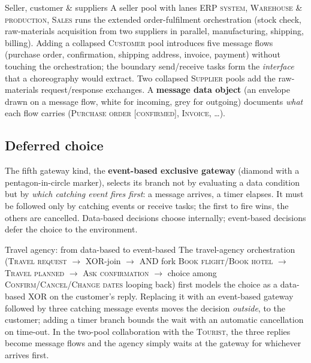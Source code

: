 \begin{examplebox}{Seller, customer \& suppliers}
A seller pool with lanes \textsc{ERP system}, \textsc{Warehouse \& production}, \textsc{Sales} runs the extended order-fulfilment orchestration (stock check, raw-materials acquisition from two suppliers in parallel, manufacturing, shipping, billing). Adding a collapsed \textsc{Customer} pool introduces five message flows (purchase order, confirmation, shipping address, invoice, payment) without touching the orchestration; the boundary send/receive tasks form the \emph{interface} that a choreography would extract. Two collapsed \textsc{Supplier} pools add the raw-materials request/response exchanges. %
A \textbf{message data object} (an envelope drawn on a message flow, white for incoming, grey for outgoing) documents \emph{what} each flow carries (\textsc{Purchase order [confirmed]}, \textsc{Invoice}, \dots).
\end{examplebox}

\subsection{Deferred choice}

The fifth gateway kind, the \textbf{event-based exclusive gateway} (diamond with a pentagon-in-circle marker), selects its branch not by evaluating a data condition but by \emph{which catching event fires first}: a message arrives, a timer elapses. It must be followed only by catching events or receive tasks; the first to fire wins, the others are cancelled. Data-based decisions choose internally; event-based decisions defer the choice to the environment.

\begin{examplebox}{Travel agency: from data-based to event-based}
The travel-agency orchestration (\textsc{Travel request} $\to$ XOR-join $\to$ AND fork \textsc{Book flight}/\textsc{Book hotel} $\to$ \textsc{Travel planned} $\to$ \textsc{Ask confirmation} $\to$ choice among \textsc{Confirm}/\textsc{Cancel}/\textsc{Change dates} looping back) first models the choice as a data-based XOR on the customer's reply. Replacing it with an event-based gateway followed by three catching message events moves the decision \emph{outside}, to the customer; adding a timer branch bounds the wait with an automatic cancellation on time-out. In the two-pool collaboration with the \textsc{Tourist}, the three replies become message flows and the agency simply waits at the gateway for whichever arrives first.
\end{examplebox}


